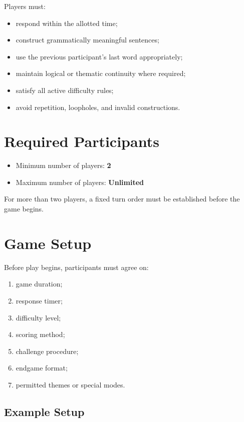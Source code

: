 \documentclass[11pt,a4paper]{article}
\begin{document}
Players must:

\begin{itemize}
    \item respond within the allotted time;
    \item construct grammatically meaningful sentences;
    \item use the previous participant's last word appropriately;
    \item maintain logical or thematic continuity where required;
    \item satisfy all active difficulty rules;
    \item avoid repetition, loopholes, and invalid constructions.
\end{itemize}

\section{Required Participants}

\begin{itemize}
    \item Minimum number of players: \textbf{2}
    \item Maximum number of players: \textbf{Unlimited}
\end{itemize}

For more than two players, a fixed turn order must be established before the game begins.

\section{Game Setup}

Before play begins, participants must agree on:

\begin{enumerate}
    \item game duration;
    \item response timer;
    \item difficulty level;
    \item scoring method;
    \item challenge procedure;
    \item endgame format;
    \item permitted themes or special modes.
\end{enumerate}

\subsection{Example Setup}
\end{document}
